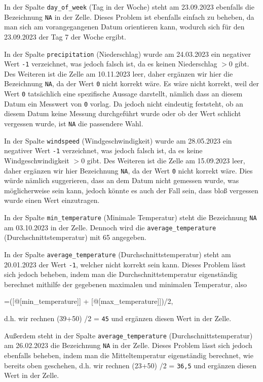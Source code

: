 \documentclass[a4paper,12pt]{article}
\begin{document}
In der Spalte \texttt{day\_of\_week} (Tag in der Woche) steht am 23.09.2023 ebenfalls die Bezeichnung \texttt{NA} in der Zelle. Dieses Problem ist ebenfalls einfach zu beheben, da man sich am vorangegangenen Datum orientieren kann, wodurch sich für den 23.09.2023 der Tag 7 der Woche ergibt.

In der Spalte \texttt{precipitation} (Niederschlag) wurde am 24.03.2023 ein negativer Wert \texttt{-1} verzeichnet, was jedoch falsch ist, da es keinen Niederschlag \texttt{$> 0$} gibt. Des Weiteren ist die Zelle am 10.11.2023 leer, daher ergänzen wir hier die Bezeichnung \texttt{NA}, da der Wert \texttt{0} nicht korrekt wäre. Es wäre nicht korrekt, weil der Wert \texttt{0} tatsächlich eine spezifische Aussage darstellt, nämlich dass an diesem Datum ein Messwert von \texttt{0} vorlag. Da jedoch nicht eindeutig feststeht, ob an diesem Datum keine Messung durchgeführt wurde oder ob der Wert schlicht vergessen wurde, ist \texttt{NA} die passendere Wahl.

In der Spalte \texttt{windspeed} (Windgeschwindigkeit) wurde am 28.05.2023 ein negativer Wert \texttt{-1} verzeichnet, was jedoch falsch ist, da es keine Windgeschwindigkeit \texttt{$> 0$} gibt. Des Weiteren ist die Zelle am 15.09.2023 leer, daher ergänzen wir hier Bezeichnung \texttt{NA}, da der Wert \texttt{0} nicht korrekt wäre. Dies würde nämlich suggerieren, dass an dem Datum nicht gemessen wurde, was möglicherweise sein kann, jedoch könnte es auch der Fall sein, dass bloß vergessen wurde einen Wert einzutragen.

In der Spalte \texttt{min\_temperature} (Minimale Temperatur) steht die Bezeichnung \texttt{NA} am 03.10.2023 in der Zelle. Dennoch wird die \texttt{average\_temperature} (Durchschnittstemperatur) mit 65 angegeben.

In der Spalte \texttt{average\_temperature} (Durchschnittstemperatur) steht am 20.01.2023 der Wert \texttt{-1}, welcher nicht korrekt sein kann. Dieses Problem lässt sich jedoch beheben, indem man die Durchschnittstemperatur eigenständig berechnet mithilfe der gegebenen maximalen und minimalen Temperatur, also 

=([@[min\_temperature]] + [@[max\_temperature]])/2,

d.h. wir rechnen (39+50) /2 = \texttt{45} und ergänzen diesen Wert in der Zelle.

Außerdem steht in der Spalte \texttt{average\_temperature} (Durchschnittstemperatur) am 26.02.2023 die Bezeichnung \texttt{NA} in der Zelle. Dieses Problem lässt sich jedoch ebenfalls beheben, indem man die Mitteltemperatur eigenständig berechnet, wie bereits oben geschehen, d.h. wir rechnen (23+50) /2 = \texttt{36,5} und ergänzen diesen Wert in der Zelle.
\end{document}
